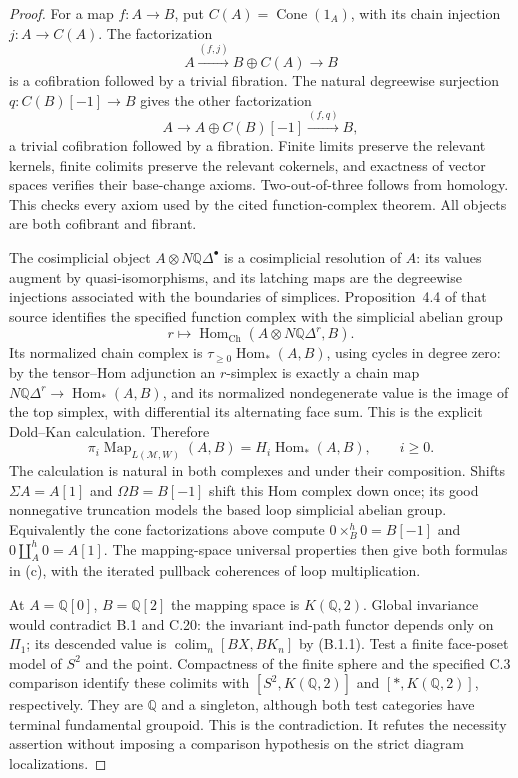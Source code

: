 \begin{proof}
For a map $f:A\to B$, put $C(A)=\operatorname{Cone}(1_A)$,
with its chain injection $j:A\to C(A)$. The factorization
\[
 A\xrightarrow{(f,j)}B\oplus C(A)\longrightarrow B
\]
is a cofibration followed by a trivial fibration. The natural
degreewise surjection $q:C(B)[-1]\to B$ gives the other
factorization
\[
 A\longrightarrow A\oplus C(B)[-1]
                    \xrightarrow{(f,q)}B,
\]
a trivial cofibration followed by a fibration. Finite limits
preserve the relevant kernels, finite colimits preserve the
relevant cokernels, and exactness of vector spaces verifies their
base-change axioms. Two-out-of-three follows from homology.
This checks every axiom used by the cited function-complex theorem.
All objects are both cofibrant and fibrant.

The cosimplicial object $A\otimes N\mathbb Q\Delta^\bullet$
is a cosimplicial resolution of $A$: its values augment by
quasi-isomorphisms, and its latching maps are the degreewise
injections associated with the boundaries of simplices.
Proposition~4.4 of that source identifies the specified function
complex with the simplicial abelian group
\[
 r\longmapsto
 \operatorname{Hom}_{\mathrm{Ch}}
       (A\otimes N\mathbb Q\Delta^r,B).
\]
Its normalized chain complex is
$\tau_{\geq0}\operatorname{Hom}_*(A,B)$, using cycles in degree
zero: by the tensor--Hom adjunction an $r$-simplex is exactly a
chain map $N\mathbb Q\Delta^r\to\operatorname{Hom}_*(A,B)$,
and its normalized nondegenerate value is the image of the top
simplex, with differential its alternating face sum. This is the
explicit Dold--Kan calculation. Therefore
\[
 \pi_i\operatorname{Map}_{L(\mathcal M,W)}(A,B)
       =H_i\operatorname{Hom}_*(A,B),\qquad i\geq0.
\]
The calculation is natural in both complexes and under their
composition. Shifts $\Sigma A=A[1]$ and $\Omega B=B[-1]$
shift this Hom complex down once; its good nonnegative truncation
models the based loop simplicial abelian group. Equivalently the
cone factorizations above compute $0\times_B^h0=B[-1]$ and
$0\amalg_A^h0=A[1]$. The mapping-space universal properties
then give both formulas in (c), with the iterated pullback
coherences of loop multiplication.

At $A=\mathbb Q[0]$, $B=\mathbb Q[2]$ the mapping space is
$K(\mathbb Q,2)$. Global invariance would contradict B.1 and
C.20: the invariant ind-path functor depends only on $\Pi_1$;
its descended value is $\operatorname{colim}_n[BX,BK_n]$ by
(B.1.1). Test a finite face-poset model of $S^2$ and the point.
Compactness of the finite sphere and the specified C.3 comparison
identify these colimits with $[S^2,K(\mathbb Q,2)]$ and
$[*,K(\mathbb Q,2)]$, respectively. They are $\mathbb Q$ and
a singleton, although both test categories have terminal
fundamental groupoid. This is the contradiction. It refutes the
necessity assertion without imposing a comparison hypothesis on
the strict diagram localizations.
\end{proof}

